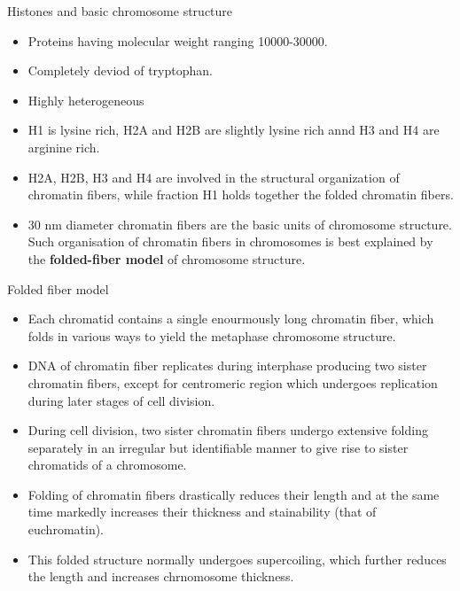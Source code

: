 \documentclass[11pt,dvipsnames,ignorenonframetext,aspectratio=169]{beamer}
\providecommand{\tightlist}{%
  \setlength{\itemsep}{0pt}\setlength{\parskip}{0pt}}
\begin{document}
\begin{frame}{Histones and basic chromosome structure}
\protect\hypertarget{histones-and-basic-chromosome-structure}{}

\begin{itemize}
\tightlist
\item
  Proteins having molecular weight ranging 10000-30000.
\item
  Completely deviod of tryptophan.
\item
  Highly heterogeneous
\item
  H1 is lysine rich, H2A and H2B are slightly lysine rich annd H3 and H4
  are arginine rich.
\item
  H2A, H2B, H3 and H4 are involved in the structural organization of
  chromatin fibers, while fraction H1 holds together the folded
  chromatin fibers.
\item
  30 nm diameter chromatin fibers are the basic units of chromosome
  structure. Such organisation of chromatin fibers in chromosomes is
  best explained by the \textbf{folded-fiber model} of chromosome
  structure.
\end{itemize}

\end{frame}

\begin{frame}{Folded fiber model}
\protect\hypertarget{folded-fiber-model}{}

\begin{itemize}
\tightlist
\item
  Each chromatid contains a single enourmously long chromatin fiber,
  which folds in various ways to yield the metaphase chromosome
  structure.
\item
  DNA of chromatin fiber replicates during interphase producing two
  sister chromatin fibers, except for centromeric region which undergoes
  replication during later stages of cell division.
\item
  During cell division, two sister chromatin fibers undergo extensive
  folding separately in an irregular but identifiable manner to give
  rise to sister chromatids of a chromosome.
\item
  Folding of chromatin fibers drastically reduces their length and at
  the same time markedly increases their thickness and stainability
  (that of euchromatin).
\item
  This folded structure normally undergoes supercoiling, which further
  reduces the length and increases chrnomosome thickness.
\end{itemize}

\end{frame}
\end{document}
